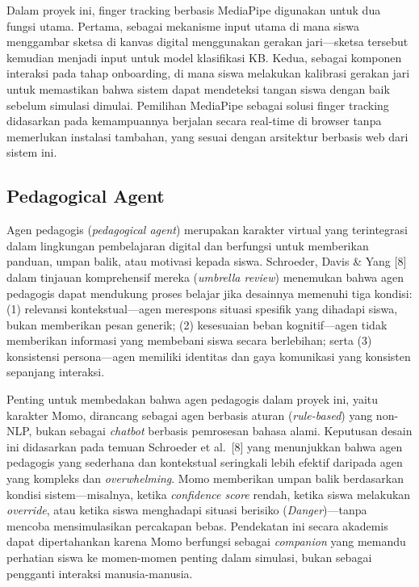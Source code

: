 \documentclass[12pt,oneside]{report}
\begin{document}
Dalam proyek ini, finger tracking berbasis MediaPipe digunakan untuk dua fungsi utama. Pertama, sebagai mekanisme input utama di mana siswa menggambar sketsa di kanvas digital menggunakan gerakan jari---sketsa tersebut kemudian menjadi input untuk model klasifikasi KB. Kedua, sebagai komponen interaksi pada tahap onboarding, di mana siswa melakukan kalibrasi gerakan jari untuk memastikan bahwa sistem dapat mendeteksi tangan siswa dengan baik sebelum simulasi dimulai. Pemilihan MediaPipe sebagai solusi finger tracking didasarkan pada kemampuannya berjalan secara real-time di browser tanpa memerlukan instalasi tambahan, yang sesuai dengan arsitektur berbasis web dari sistem ini.

\subsection{Pedagogical Agent}
\label{subsec:pedagogical-agent}

Agen pedagogis (\textit{pedagogical agent}) merupakan karakter virtual yang terintegrasi dalam lingkungan pembelajaran digital dan berfungsi untuk memberikan panduan, umpan balik, atau motivasi kepada siswa. Schroeder, Davis \& Yang [8] dalam tinjauan komprehensif mereka (\textit{umbrella review}) menemukan bahwa agen pedagogis dapat mendukung proses belajar jika desainnya memenuhi tiga kondisi: (1) relevansi kontekstual---agen merespons situasi spesifik yang dihadapi siswa, bukan memberikan pesan generik; (2) kesesuaian beban kognitif---agen tidak memberikan informasi yang membebani siswa secara berlebihan; serta (3) konsistensi persona---agen memiliki identitas dan gaya komunikasi yang konsisten sepanjang interaksi.

Penting untuk membedakan bahwa agen pedagogis dalam proyek ini, yaitu karakter Momo, dirancang sebagai agen berbasis aturan (\textit{rule-based}) yang non-NLP, bukan sebagai \textit{chatbot} berbasis pemrosesan bahasa alami. Keputusan desain ini didasarkan pada temuan Schroeder et al.\ [8] yang menunjukkan bahwa agen pedagogis yang sederhana dan kontekstual seringkali lebih efektif daripada agen yang kompleks dan \textit{overwhelming}. Momo memberikan umpan balik berdasarkan kondisi sistem---misalnya, ketika \textit{confidence score} rendah, ketika siswa melakukan \textit{override}, atau ketika siswa menghadapi situasi berisiko (\textit{Danger})---tanpa mencoba mensimulasikan percakapan bebas. Pendekatan ini secara akademis dapat dipertahankan karena Momo berfungsi sebagai \textit{companion} yang memandu perhatian siswa ke momen-momen penting dalam simulasi, bukan sebagai pengganti interaksi manusia-manusia.
\end{document}
